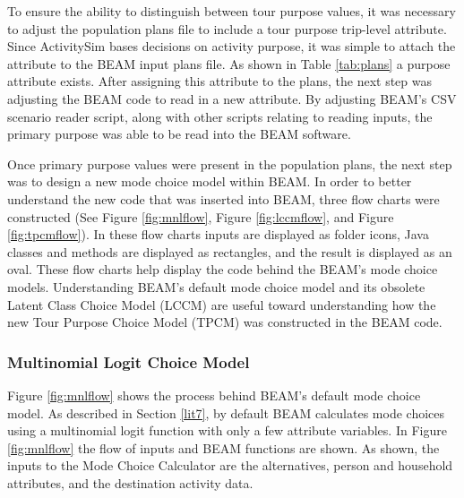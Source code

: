 \documentclass[12pt, oneside, openright]{byuthesis}
\begin{document}
To ensure the ability to distinguish between tour purpose values, it was necessary to adjust the population plans file to include a tour purpose trip-level attribute. Since ActivitySim bases decisions on activity purpose, it was simple to attach the attribute to the BEAM input plans file. As shown in Table \ref{tab:plans} a purpose attribute exists. After assigning this attribute to the plans, the next step was adjusting the BEAM code to read in a new attribute. By adjusting BEAM's CSV scenario reader script, along with other scripts relating to reading inputs, the primary purpose was able to be read into the BEAM software.

Once primary purpose values were present in the population plans, the next step was to design a new mode choice model within BEAM. In order to better understand the new code that was inserted into BEAM, three flow charts were constructed (See Figure \ref{fig:mnlflow}, Figure \ref{fig:lccmflow}, and Figure \ref{fig:tpcmflow}). In these flow charts inputs are displayed as folder icons, Java classes and methods are displayed as rectangles, and the result is displayed as an oval. These flow charts help display the code behind the BEAM's mode choice models. Understanding BEAM's default mode choice model and its obsolete Latent Class Choice Model (LCCM) are useful toward understanding how the new Tour Purpose Choice Model (TPCM) was constructed in the BEAM code.

\hypertarget{multinomial-logit-choice-model}{%
\subsubsection{Multinomial Logit Choice Model}\label{multinomial-logit-choice-model}}

Figure \ref{fig:mnlflow} shows the process behind BEAM's default mode choice model. As described in Section \ref{lit7}, by default BEAM calculates mode choices using a multinomial logit function with only a few attribute variables. In Figure \ref{fig:mnlflow} the flow of inputs and BEAM functions are shown. As shown, the inputs to the Mode Choice Calculator are the alternatives, person and household attributes, and the destination activity data.
\end{document}
